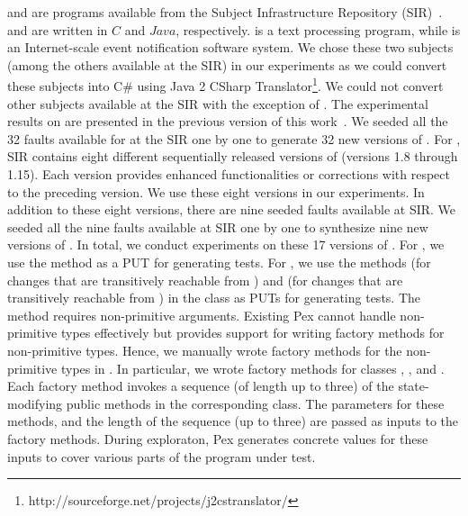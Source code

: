  and  are programs available from the Subject Infrastructure Repository (SIR)~\cite{doESE05}.  and  are written in $C$ and $Java$, respectively.  is a text processing program, while  is an Internet-scale event notification software system. We chose these two subjects (among the others available at the SIR) in our experiments as we could convert these subjects into C\# using Java 2 CSharp Translator\footnote{http://sourceforge.net/projects/j2cstranslator/}. We could not convert other subjects available at the SIR with the exception of . The experimental results on  are presented in the previous version of this work~\cite{taneja09:guided}. We seeded all the 32 faults available for  at the SIR one by one to generate 32 new versions of . For , SIR contains eight different sequentially released versions of  (versions 1.8 through 1.15). Each version provides enhanced functionalities or corrections with respect to the preceding version. We use these eight versions in our experiments. In addition to these eight versions, there are nine seeded faults available at SIR. We seeded all the nine faults available at SIR one by one to synthesize nine new versions of . 
In total, we conduct experiments on these 17 versions of . For , we use the  method as a PUT for generating tests. For , we use the methods  (for changes that are transitively reachable from ) and  (for changes that are transitively reachable from ) in the class  as PUTs for generating tests. The method  requires non-primitive arguments. Existing Pex cannot handle non-primitive types effectively but provides support for writing factory methods for non-primitive types. Hence, we manually wrote factory methods for the non-primitive types in . In particular, we wrote factory methods for classes , , and . Each factory method invokes a sequence (of length up to three) of the state-modifying public methods in the corresponding class. The parameters for these methods, and the length of the sequence (up to three) are passed as inputs to the factory methods. During exploraton, Pex generates concrete values for these inputs to cover various parts of the program under test.

